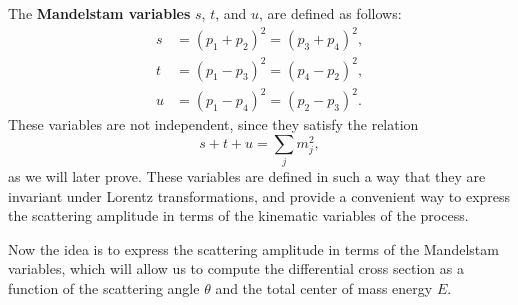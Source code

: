 \begin{definition}
    The \textbf{Mandelstam variables} \(s\), \(t\), and \(u\), are defined as follows:
    \[
        \begin{aligned}
            s & = (p_1 + p_2)^2 = (p_3 + p_4)^2, \\
            t & = (p_1 - p_3)^2 = (p_4 - p_2)^2, \\
            u & = (p_1 - p_4)^2 = (p_2 - p_3)^2.
        \end{aligned}
    \]
    These variables are not independent, since they satisfy the relation
    \[
        s + t + u = \sum_{j} m_j^2,
    \]
    as we will later prove. These variables are defined in such a way that they are invariant under Lorentz transformations, and provide a convenient way to express the scattering amplitude in terms of the kinematic variables of the process.
\end{definition}

Now the idea is to express the scattering amplitude in terms of the Mandelstam variables, which will allow us to compute the differential cross section as a function of the scattering angle \(\theta\) and the total center of mass energy \(E\).

